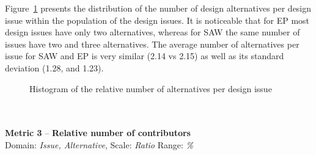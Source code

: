 \documentclass[article]{elsarticle}
\begin{document}
Figure~\ref{fig:M2} presents the distribution of the number of design alternatives per design issue within the population of the design issues. It is noticeable that for EP most design issues have only two alternatives, whereas for SAW the same number of issues have two and three alternatives. The average number of alternatives per issue for SAW and EP is very similar (2.14 vs 2.15) as well as its standard deviation (1.28, and 1.23).
\begin{figure}
	\begin{center}
	\end{center}

	\caption{Histogram of the relative number of alternatives per design issue}
	\label{fig:M2}

	\begin{comment}
	  \begin{center}
	  \texttt{[image: M2.pdf]}
	  \caption{Histogram of the relative number of alternatives per design issue}
	  \label{fig:M2}
	  \end{center}
	\end{comment}

\end{figure}
\\
\\
\noindent
\textbf{Metric 3} -- \textbf{Relative number of contributors}\\
Domain: \emph{Issue, Alternative}, Scale: \emph{Ratio} Range: \emph{\%}
\end{document}
